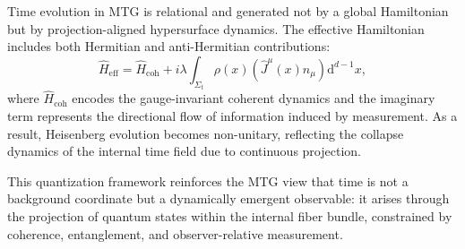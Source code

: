 \documentclass[11pt]{article}
\begin{document}
Time evolution in MTG is relational and generated not by a global Hamiltonian but by projection-aligned hypersurface dynamics. The effective Hamiltonian includes both Hermitian and anti-Hermitian contributions:
\begin{equation}
\hat{H}_{\mathrm{eff}} = \hat{H}_{\mathrm{coh}} + i \lambda \int_{\Sigma_t} \rho(x) \left( \hat{J}^\mu(x) n_\mu \right) \mathrm{d}^{d-1}x,
\end{equation}
where \( \hat{H}_{\mathrm{coh}} \) encodes the gauge-invariant coherent dynamics and the imaginary term represents the directional flow of information induced by measurement. As a result, Heisenberg evolution becomes non-unitary, reflecting the collapse dynamics of the internal time field due to continuous projection.

This quantization framework reinforces the MTG view that time is not a background coordinate but a dynamically emergent observable: it arises through the projection of quantum states within the internal fiber bundle, constrained by coherence, entanglement, and observer-relative measurement.
\end{document}
